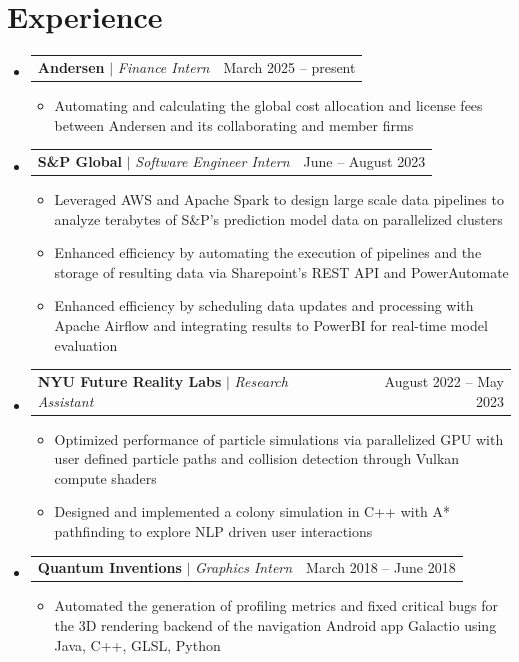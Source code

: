 \documentclass[letterpaper,11pt]{article}
\makeatletter
\newcommand{\resumeItem}[1]{
  \item\small{
    {#1 \vspace{-2pt}}
  }
}
\newcommand{\resumeProjectHeading}[2]{
    \item
    \begin{tabular*}{0.97\textwidth}{l@{\extracolsep{\fill}}r}
      \small#1 & #2 \\
    \end{tabular*}\vspace{-7pt}
}
\newcommand{\resumeSubHeadingListStart}{\begin{itemize}[leftmargin=0.15in, label={}]}
\newcommand{\resumeSubHeadingListEnd}{\end{itemize}}
\newcommand{\resumeItemListStart}{\begin{itemize}}
\newcommand{\resumeItemListEnd}{\end{itemize}\vspace{-5pt}}
\makeatother
\begin{document}
\section{Experience}
  \resumeSubHeadingListStart


        \resumeProjectHeading
          {\textbf{Andersen} $|$ \footnotesize\emph{Finance Intern}\vspace{8pt}}{March 2025 -- present}
        \resumeItemListStart
	    \resumeItem{Automating and calculating the global cost allocation and license fees between Andersen and its collaborating and member firms}
        \resumeItemListEnd

        \resumeProjectHeading
          {\textbf{S\&P Global} $|$ \footnotesize\emph{Software Engineer Intern}\vspace{8pt}}{June -- August 2023}
        \resumeItemListStart
	    \resumeItem{Leveraged AWS and Apache Spark to design large scale data pipelines to analyze terabytes of S\&P's prediction model data on parallelized clusters}
            \resumeItem{Enhanced efficiency by automating the execution of pipelines and the storage of resulting data via Sharepoint's REST API and PowerAutomate}
            \resumeItem{Enhanced efficiency by scheduling data updates and processing with Apache Airflow and integrating results to PowerBI for real-time model evaluation }
        \resumeItemListEnd

        \resumeProjectHeading
          {\textbf{NYU Future Reality Labs}\vspace{8pt} $|$ \footnotesize\emph{Research Assistant}}{August 2022 -- May 2023}
        \resumeItemListStart
            \resumeItem{Optimized performance of particle simulations via parallelized GPU with user defined particle paths and collision detection through Vulkan compute shaders}
	    \resumeItem{Designed and implemented a colony simulation in C++ with A* pathfinding to explore NLP driven user interactions}
        \resumeItemListEnd

        \resumeProjectHeading
          {\textbf{Quantum Inventions} $|$ \footnotesize\emph{Graphics Intern}\vspace{8pt}}{March 2018 -- June 2018}
        \resumeItemListStart
            \resumeItem{Automated the generation of profiling metrics and fixed critical bugs for the 3D rendering backend of the navigation Android app Galactio using Java, C++, GLSL, Python}
        \resumeItemListEnd
          
    \resumeSubHeadingListEnd 
\end{document}
